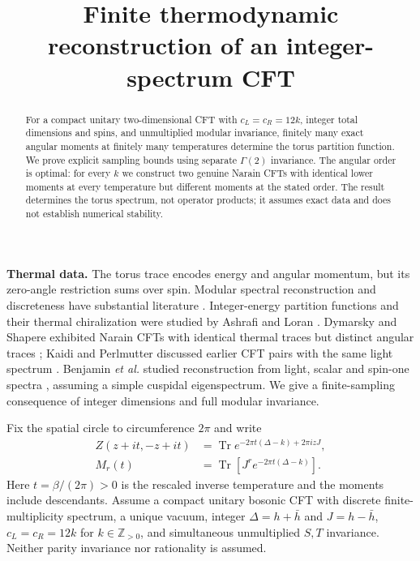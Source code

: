 \documentclass[aps,prl,reprint,10pt,longbibliography]{revtex4-2}
\newcommand{\Tr}{\operatorname{Tr}}
\newcommand{\Z}{\mathbb Z}
\begin{document}
\title{Finite thermodynamic reconstruction of an integer-spectrum CFT}
\begin{abstract}
For a compact unitary two-dimensional CFT with $c_L=c_R=12k$, integer
total dimensions and spins, and unmultiplied modular invariance, finitely
many exact angular moments at finitely many temperatures determine the
torus partition function. We prove explicit sampling bounds using
separate $\Gamma(2)$ invariance. The angular order is optimal: for every
$k$ we construct two genuine Narain CFTs with identical lower moments
at every temperature but different moments at the stated order.
The result determines the torus spectrum, not operator products; it
assumes exact data and does not establish numerical stability.
\end{abstract}
\maketitle

\noindent\textbf{Thermal data.}
The torus trace encodes energy and angular momentum, but its zero-angle
restriction sums over spin. Modular spectral reconstruction and
discreteness have substantial literature \cite{ashrafi,kaidi,benjamin}.
Integer-energy partition functions and their thermal chiralization were
studied by Ashrafi and Loran \cite{ashrafi}. Dymarsky and Shapere
exhibited Narain CFTs with identical thermal traces but distinct angular
traces \cite{codes}; Kaidi and Perlmutter discussed earlier CFT pairs
with the same light spectrum \cite{kaidi}. Benjamin \emph{et al.}
studied reconstruction from light, scalar and spin-one spectra
\cite{benjamin}, assuming a simple cuspidal eigenspectrum. We give a finite-sampling
consequence of integer dimensions and full modular invariance.

Fix the spatial circle to circumference $2\pi$ and write
\begin{equation}
\begin{aligned}
 Z(z+it,-z+it)&=\Tr e^{-2\pi t(\Delta-k)+2\pi izJ},\\
 M_r(t)&=\Tr[J^r e^{-2\pi t(\Delta-k)}].
\end{aligned}
 \label{eq:trace}
\end{equation}
Here $t=\beta/(2\pi)>0$ is the rescaled inverse temperature and the
moments include descendants. Assume a
compact unitary bosonic CFT with discrete finite-multiplicity spectrum,
a unique vacuum, integer $\Delta=h+\bar h$ and $J=h-\bar h$,
$c_L=c_R=12k$ for $k\in\Z_{>0}$, and simultaneous unmultiplied
$S,T$ invariance. Neither parity invariance nor rationality is assumed.
\end{document}
